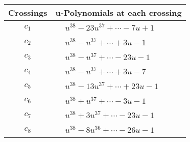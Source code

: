 \documentclass[1p]{elsarticle_modified}
\theoremstyle{definition}
\begin{document}
\begin{tabular}{m{50pt}|m{274pt}}
Crossings & \hspace{64pt}u-Polynomials at each crossing \\
\hline $$\begin{aligned}c_{1}\end{aligned}$$&$\begin{aligned}
&u^{38}-23 u^{37}+\cdots-7 u+1
\end{aligned}$\\
\hline $$\begin{aligned}c_{2}\end{aligned}$$&$\begin{aligned}
&u^{38}- u^{37}+\cdots+3 u-1
\end{aligned}$\\
\hline $$\begin{aligned}c_{3}\end{aligned}$$&$\begin{aligned}
&u^{38}- u^{37}+\cdots-23 u-1
\end{aligned}$\\
\hline $$\begin{aligned}c_{4}\end{aligned}$$&$\begin{aligned}
&u^{38}- u^{37}+\cdots+3 u-7
\end{aligned}$\\
\hline $$\begin{aligned}c_{5}\end{aligned}$$&$\begin{aligned}
&u^{38}-13 u^{37}+\cdots+23 u-1
\end{aligned}$\\
\hline $$\begin{aligned}c_{6}\end{aligned}$$&$\begin{aligned}
&u^{38}+u^{37}+\cdots-3 u-1
\end{aligned}$\\
\hline $$\begin{aligned}c_{7}\end{aligned}$$&$\begin{aligned}
&u^{38}+3 u^{37}+\cdots-23 u-1
\end{aligned}$\\
\hline $$\begin{aligned}c_{8}\end{aligned}$$&$\begin{aligned}
&u^{38}-8 u^{36}+\cdots-26 u-1
\end{aligned}$\\

\end{tabular}
\end{document}
